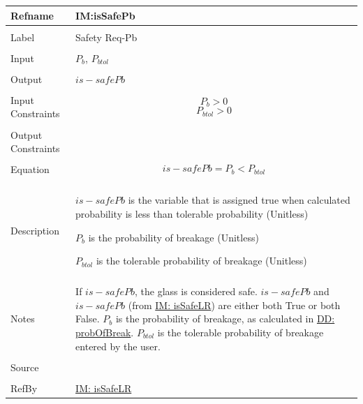\documentclass[12pt]{article}
\begin{document}
\noindent \begin{minipage}{\textwidth}
\begin{tabular}{p{} p{}}
\toprule \textbf{Refname} & \textbf{IM:isSafePb}
\label{IM:isSafePb}
\\ \midrule \\
Label & Safety Req-Pb
\\ \midrule \\
Input & ${P_{b}}$, ${P_{btol}}$
\\ \midrule \\
Output & $is-safePb$
\\ \midrule \\
Input Constraints & \begin{displaymath}
                    {P_{b}}>0
                    \end{displaymath}
                    \begin{displaymath}
                    {P_{btol}}>0
                    \end{displaymath}
\\ \midrule \\
Output Constraints & 
\\ \midrule \\
Equation & \begin{displaymath}
           is-safePb={P_{b}}<{P_{btol}}
           \end{displaymath}
\\ \midrule \\
Description & \begin{symbDescription}
              \item{$is-safePb$ is the variable that is assigned true when calculated probability is less than tolerable probability (Unitless)}
              \item{${P_{b}}$ is the probability of breakage (Unitless)}
              \item{${P_{btol}}$ is the tolerable probability of breakage (Unitless)}
              \end{symbDescription}
\\ \midrule \\
Notes & If $is-safePb$, the glass is considered safe. $is-safePb$ and $is-safePb$ (from \hyperref[IM:isSafeLR]{IM: isSafeLR}) are either both True or both False. ${P_{b}}$ is the probability of breakage, as calculated in \hyperref[DD:probOfBreak]{DD: probOfBreak}. ${P_{btol}}$ is the tolerable probability of breakage entered by the user.
\\ \midrule \\
Source & \cite{astm2009}
\\ \midrule \\
RefBy & \hyperref[IM:isSafeLR]{IM: isSafeLR}
\\ \bottomrule \end{tabular}
\end{minipage}
\par~
\end{document}
